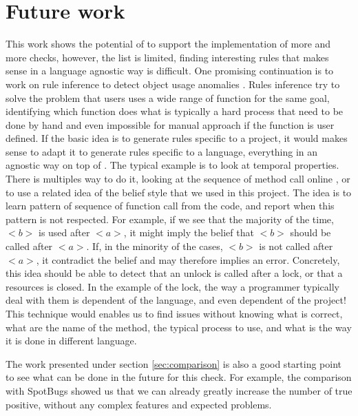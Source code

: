 \section{Future work}
\label{sec:future_work}

This work shows the potential of \slang to support the implementation of more and more checks, however, the list is limited, finding interesting rules that makes sense in a language agnostic way is difficult. 
One promising continuation is to work on rule inference to detect object usage anomalies \cite{Wasylkowski:2007:DOU:1287624.1287632}. \newline
Rules inference try to solve the problem that users uses a wide range of function for the same goal,  identifying which function does what is typically a hard process that need to be done by hand and even impossible for manual approach if the function is user defined. 
If the basic idea is to generate rules specific to a project, it would makes sense to adapt it to generate rules specific to a language, everything in an agnostic way on top of \slang. 
The typical example is to look at temporal properties. 
There is multiples way to do it, looking at the sequence of method call online \cite{Gabel:2010:OIE:1806799.1806806}, or to use a related idea of the belief style \cite{Engler:2001:BDB:502059.502041} that we used in this project. 
The idea is to learn pattern of sequence of function call from the code, and report when this pattern is not respected. 
For example, if we see that the majority of the time, \emph{$<b>$} is used after \emph{$<a>$}, it might imply the belief that \emph{$<b>$} should be called after \emph{$<a>$}. If, in the minority of the cases, \emph{$<b>$} is not called after \emph{$<a>$}, it contradict the belief and may therefore implies an error. 
Concretely, this idea should be able to detect that an unlock is called after a lock, or that a resources is closed. 
In the example of the lock, the way a programmer typically deal with them is dependent of the language, and even dependent of the project! \newline
This technique would enables us to find issues without knowing what is correct, what are the name of the method, the typical process to use, and what is the way it is done in different language.

The work presented under section \ref{sec:comparison} is also a good starting point to see what can be done in the future for this check. 
For example, the comparison with SpotBugs showed us that we can already greatly increase the number of true positive, without any complex features and expected problems.